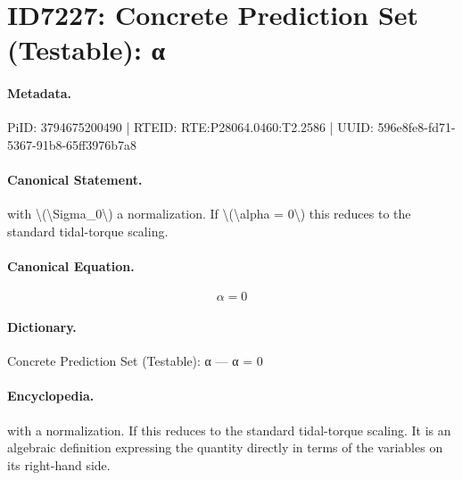 \section*{ID7227: Concrete Prediction Set (Testable): α}
\paragraph{Metadata.}
PiID: 3794675200490 | RTEID: RTE:P28064.0460:T2.2586 | UUID: 596e8fe8-fd71-5367-91b8-65ff3976b7a8

\paragraph{Canonical Statement.}
with \textbackslash{}(\textbackslash{}Sigma\_0\textbackslash{}) a normalization. If \textbackslash{}(\textbackslash{}alpha = 0\textbackslash{}) this reduces to the standard tidal-torque scaling.

\paragraph{Canonical Equation.}
\[
\alpha = 0
\]

\paragraph{Dictionary.}
Concrete Prediction Set (Testable): α — α = 0

\paragraph{Encyclopedia.}
with a normalization. If this reduces to the standard tidal-torque scaling. It is an algebraic definition expressing the quantity directly in terms of the variables on its right-hand side.
